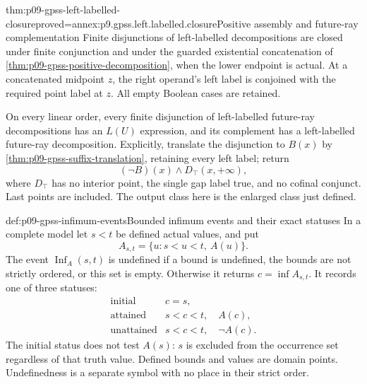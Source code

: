 \begin{hblemma}{thm:p09-gpss-left-labelled-closure}{proved=annex:p9.gpss.left.labelled.closure}{Positive assembly and future-ray complementation}
Finite disjunctions of left-labelled decompositions are closed under
finite conjunction and under the guarded existential concatenation of
\cref{thm:p09-gpss-positive-decomposition}, when the lower endpoint
is actual. At a concatenated midpoint \(z\), the right operand's
left label is conjoined with the required point label at \(z\).
All empty Boolean cases are retained.

On every linear order, every finite disjunction of left-labelled
future-ray decompositions has an \(L(U)\) expression, and its
complement has a left-labelled future-ray decomposition. Explicitly,
translate the disjunction to \(B(x)\) by
\cref{thm:p09-gpss-suffix-translation}, retaining every left label;
return
\[
              (\neg B)(x)\land D_{\top}(x,+\infty),
\]
where \(D_{\top}\) has no interior point, the single gap label
true, and no cofinal conjunct. Last points are included. The output
class here is the enlarged class just defined.
\end{hblemma}

\begin{hbdefinition}{def:p09-gpss-infimum-events}{Bounded infimum events and their exact statuses}
In a complete model let \(s<t\) be defined actual values, and put
\[
                     A_{s,t}=\{u:s<u<t,\ A(u)\}.
\]
The event \(\operatorname{Inf}_A(s,t)\) is undefined if a bound is
undefined, the bounds are not strictly ordered, or this set is empty.
Otherwise it returns \(c=\inf A_{s,t}\). It records one of three
statuses:
\[
\begin{array}{c|l}
 \mathrm{initial}&c=s,\\
 \mathrm{attained}&s<c<t,\quad A(c),\\
 \mathrm{unattained}&s<c<t,\quad\neg A(c).
\end{array}
\]
The initial status does not test \(A(s)\): \(s\) is excluded from
the occurrence set regardless of that truth value. Defined bounds and
values are domain points. Undefinedness is a separate symbol with no
place in their strict order.
\end{hbdefinition}

